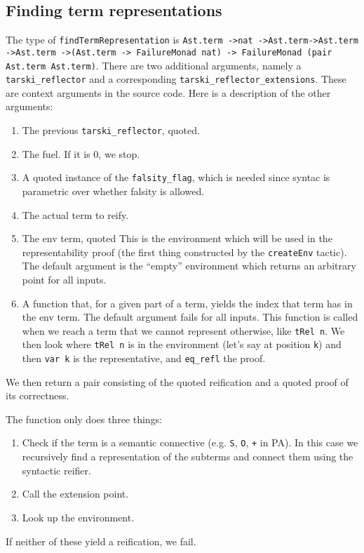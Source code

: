 \documentclass[11pt,a4paper]{article}
\begin{document}
\subsection{Finding term representations}
The type of \lstinline|findTermRepresentation| is \lstinline|Ast.term ->nat ->Ast.term->Ast.term ->Ast.term ->(Ast.term -> FailureMonad nat) -> FailureMonad (pair Ast.term Ast.term)|. There are two additional arguments, namely a \lstinline|tarski_reflector| and a corresponding
\lstinline|tarski_reflector_extensions|. These are context arguments in the source code. Here is a description of the other arguments:
\begin{enumerate}
\item The previous \lstinline|tarski_reflector|, quoted.
\item The fuel. If it is 0, we stop.
\item A quoted instance of the \lstinline|falsity_flag|, which is needed since syntac is parametric over whether falsity is allowed.
\item The actual term to reify.
\item The env term, quoted This is the environment which will be used in the representability proof (the first thing constructed by the \lstinline|createEnv| tactic). The default argument is the \enquote{empty} environment which returns an arbitrary point for all inputs.
\item A function that, for a given part of a term, yields the index that term has in the env term. The default argument fails for all inputs. This function is called when we reach a term that we cannot represent otherwise, like \lstinline|tRel n|. We then look where \lstinline|tRel n| is in the environment (let's say at position \lstinline|k|) and then \lstinline|var k| is the representative, and \lstinline|eq_refl| the proof.
\end{enumerate}
We then return a pair consisting of the quoted reification and a quoted proof of its correctness.

The function only does three things:
\begin{enumerate}
\item Check if the term is a semantic connective (e.g. \lstinline|S|, \lstinline|O|, \lstinline|+| in PA). In this case we recursively find a representation of the subterms and connect them using the syntactic reifier.
\item Call the extension point.
\item Look up the environment.
\end{enumerate}
If neither of these yield a reification, we fail.
\end{document}
